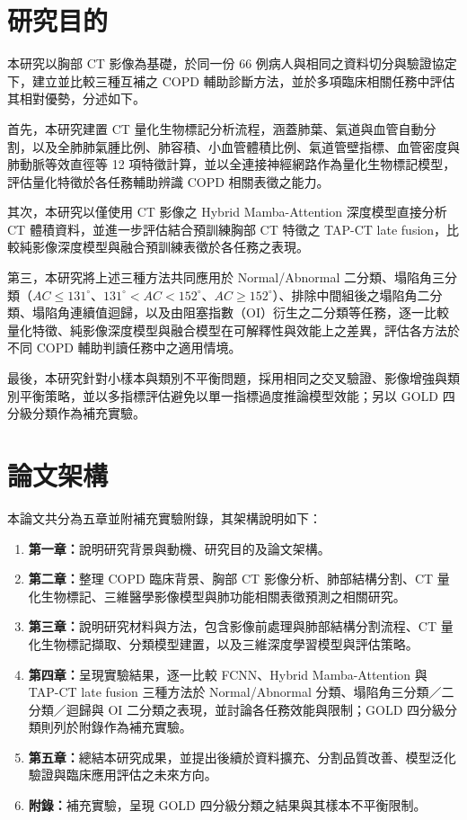 \begin{ZhChapter}
\section{研究目的}

本研究以胸部 CT 影像為基礎，於同一份 66 例病人與相同之資料切分與驗證協定下，建立並比較三種互補之 COPD 輔助診斷方法，並於多項臨床相關任務中評估其相對優勢，分述如下。

首先，本研究建置 CT 量化生物標記分析流程，涵蓋肺葉、氣道與血管自動分割，以及全肺肺氣腫比例、肺容積、小血管體積比例、氣道管壁指標、血管密度與肺動脈等效直徑等 12 項特徵計算，並以全連接神經網路作為量化生物標記模型，評估量化特徵於各任務輔助辨識 COPD 相關表徵之能力\cite{park2025qctcopd}。

其次，本研究以僅使用 CT 影像之 Hybrid Mamba-Attention 深度模型直接分析 CT 體積資料，並進一步評估結合預訓練胸部 CT 特徵之 TAP-CT late fusion，比較純影像深度模型與融合預訓練表徵於各任務之表現。

第三，本研究將上述三種方法共同應用於 Normal/Abnormal 二分類、塌陷角三分類（$AC \leq 131^{\circ}$、$131^{\circ} < AC < 152^{\circ}$、$AC \geq 152^{\circ}$）、排除中間組後之塌陷角二分類、塌陷角連續值迴歸，以及由阻塞指數（OI）衍生之二分類等任務，逐一比較量化特徵、純影像深度模型與融合模型在可解釋性與效能上之差異，評估各方法於不同 COPD 輔助判讀任務中之適用情境。

最後，本研究針對小樣本與類別不平衡問題，採用相同之交叉驗證、影像增強與類別平衡策略，並以多指標評估避免以單一指標過度推論模型效能；另以 GOLD 四分級分類作為補充實驗。

\clearpage
\section{論文架構}

本論文共分為五章並附補充實驗附錄，其架構說明如下：

\begin{enumerate}
    \item \textbf{第一章：}說明研究背景與動機、研究目的及論文架構。
    \item \textbf{第二章：}整理 COPD 臨床背景、胸部 CT 影像分析、肺部結構分割、CT 量化生物標記、三維醫學影像模型與肺功能相關表徵預測之相關研究。
    \item \textbf{第三章：}說明研究材料與方法，包含影像前處理與肺部結構分割流程、CT 量化生物標記擷取、分類模型建置，以及三維深度學習模型與評估策略。
    \item \textbf{第四章：}呈現實驗結果，逐一比較 FCNN、Hybrid Mamba-Attention 與 TAP-CT late fusion 三種方法於 Normal/Abnormal 分類、塌陷角三分類／二分類／迴歸與 OI 二分類之表現，並討論各任務效能與限制；GOLD 四分級分類則列於附錄作為補充實驗。
    \item \textbf{第五章：}總結本研究成果，並提出後續於資料擴充、分割品質改善、模型泛化驗證與臨床應用評估之未來方向。
    \item \textbf{附錄：}補充實驗，呈現 GOLD 四分級分類之結果與其樣本不平衡限制。
\end{enumerate}

\end{ZhChapter}
